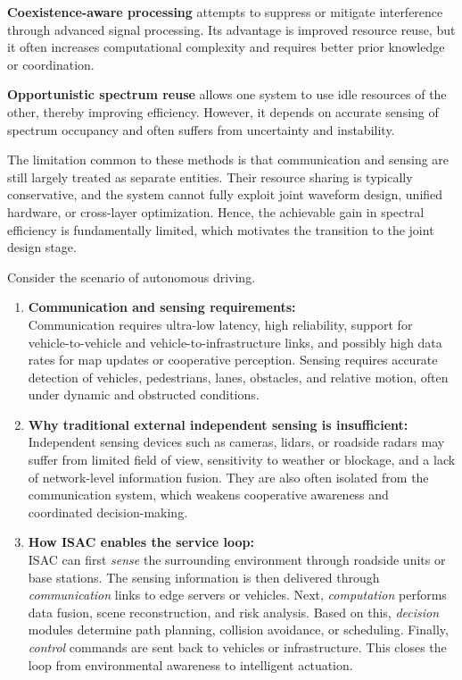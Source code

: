 \begin{enumerate}[label=\textbf{\arabic*.}, leftmargin=*]
    \textbf{Coexistence-aware processing} attempts to suppress or mitigate interference through advanced signal processing. Its advantage is improved resource reuse, but it often increases computational complexity and requires better prior knowledge or coordination.

    \textbf{Opportunistic spectrum reuse} allows one system to use idle resources of the other, thereby improving efficiency. However, it depends on accurate sensing of spectrum occupancy and often suffers from uncertainty and instability.

    The limitation common to these methods is that communication and sensing are still largely treated as separate entities. Their resource sharing is typically conservative, and the system cannot fully exploit joint waveform design, unified hardware, or cross-layer optimization. Hence, the achievable gain in spectral efficiency is fundamentally limited, which motivates the transition to the joint design stage.
    
    \begin{sloppypar}
    \item 
    Consider the scenario of autonomous driving.

    \begin{enumerate}[label=(\alph*)]
        \item \textbf{Communication and sensing requirements:} \\
        Communication requires ultra-low latency, high reliability, support for vehicle-to-vehicle and vehicle-to-infrastructure links, and possibly high data rates for map updates or cooperative perception. Sensing requires accurate detection of vehicles, pedestrians, lanes, obstacles, and relative motion, often under dynamic and obstructed conditions.

        \item \textbf{Why traditional external independent sensing is insufficient:} \\
        Independent sensing devices such as cameras, lidars, or roadside radars may suffer from limited field of view, sensitivity to weather or blockage, and a lack of network-level information fusion. They are also often isolated from the communication system, which weakens cooperative awareness and coordinated decision-making.

        \item \textbf{How ISAC enables the service loop:} \\
        ISAC can first \emph{sense} the surrounding environment through roadside units or base stations. The sensing information is then delivered through \emph{communication} links to edge servers or vehicles. Next, \emph{computation} performs data fusion, scene reconstruction, and risk analysis. Based on this, \emph{decision} modules determine path planning, collision avoidance, or scheduling. Finally, \emph{control} commands are sent back to vehicles or infrastructure. This closes the loop from environmental awareness to intelligent actuation.
    \end{enumerate}


\end{sloppypar}
\end{enumerate}
